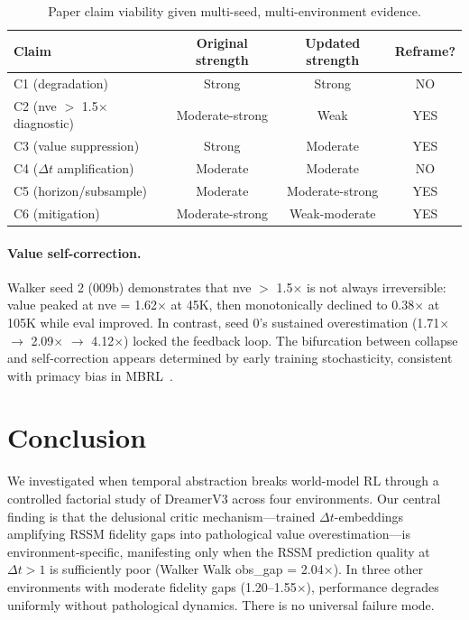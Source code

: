 \documentclass[10pt,letterpaper]{article}
\begin{document}
\begin{table}[h]
\centering
\caption{Paper claim viability given multi-seed, multi-environment evidence.}
\label{tab:claims}
\begin{tabular}{lccc}
\toprule
Claim & Original strength & Updated strength & Reframe? \\
\midrule
C1 (degradation) & Strong & Strong & NO \\
C2 (nve $>$ 1.5$\times$ diagnostic) & Moderate-strong & Weak & YES \\
C3 (value suppression) & Strong & Moderate & YES \\
C4 ($\Delta t$ amplification) & Moderate & Moderate & NO \\
C5 (horizon/subsample) & Moderate & Moderate-strong & YES \\
C6 (mitigation) & Moderate-strong & Weak-moderate & YES \\
\bottomrule
\end{tabular}
\end{table}

\paragraph{Value self-correction.}
Walker seed 2 (009b) demonstrates that nve $>$ 1.5$\times$ is not always irreversible: value peaked at nve = 1.62$\times$ at 45K, then monotonically declined to 0.38$\times$ at 105K while eval improved. In contrast, seed 0's sustained overestimation (1.71$\times$ $\rightarrow$ 2.09$\times$ $\rightarrow$ 4.12$\times$) locked the feedback loop. The bifurcation between collapse and self-correction appears determined by early training stochasticity, consistent with primacy bias in MBRL~\citep{nikishin2022primacy}.

\section{Conclusion}
\label{sec:conclusion}

We investigated when temporal abstraction breaks world-model RL through a controlled factorial study of DreamerV3 across four environments. Our central finding is that the delusional critic mechanism---trained $\Delta t$-embeddings amplifying RSSM fidelity gaps into pathological value overestimation---is environment-specific, manifesting only when the RSSM prediction quality at $\Delta t{>}1$ is sufficiently poor (Walker Walk obs\_gap = 2.04$\times$). In three other environments with moderate fidelity gaps (1.20--1.55$\times$), performance degrades uniformly without pathological dynamics. There is no universal failure mode.
\end{document}
